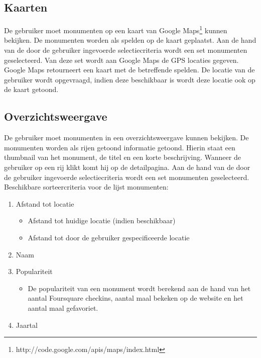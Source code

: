 \documentclass[a4paper,10pt]{article}
\begin{document}
            \subsection{Kaarten}
			De gebruiker moet monumenten op een kaart van Google Maps\footnote{http://code.google.com/apis/maps/index.html} kunnen bekijken. De monumenten worden als spelden op de kaart geplaatst. Aan de hand van de door de gebruiker ingevoerde selectiecriteria wordt een set monumenten geselecteerd. Van deze set wordt aan Google Maps de GPS locaties gegeven. Google Maps retourneert een kaart met de betreffende spelden. De locatie van de gebruiker wordt opgevraagd, indien deze beschikbaar is wordt deze locatie ook op de kaart getoond.

			\subsection{Overzichtsweergave}
			De gebruiker moet monumenten in een overzichtsweergave kunnen bekijken. De monumenten worden als rijen getoond informatie getoond. Hierin staat een thumbnail van het monument, de titel en een korte beschrijving. Wanneer de gebruiker op een rij klikt komt hij op de detailpagina.
			Aan de hand van de door de gebruiker ingevoerde selectiecriteria wordt een set monumenten geselecteerd.  Beschikbare sorteercriteria voor de lijst monumenten:
			\begin{enumerate}
			\item Afstand tot  locatie
			\begin{itemize}
			\item Afstand tot huidige locatie (indien beschikbaar)
			\item Afstand tot door de gebruiker gespecificeerde locatie
			\end{itemize}
			\item Naam
			\item Populariteit
			\begin{itemize}
			\item De populariteit van een monument wordt berekend aan de hand van het aantal Foursquare checkins, aantal maal bekeken op de website en het aantal maal gefavoriet. 
			\end{itemize}
			\item Jaartal
			\end{enumerate}
			
\end{document}
